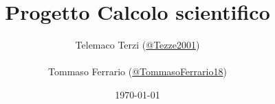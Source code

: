\documentclass[a4paper, oneside]{report}
\title{Progetto Calcolo scientifico}
\author{
    Telemaco Terzi (\href{https://github.com/Tezze2001}{@Tezze2001}) \\\\
    Tommaso Ferrario (\href{https://github.com/TommasoFerrario18}{@TommasoFerrario18})
    }
\date{\today}
\begin{document}
\maketitle
\newtheorem{teorema}{Teorema}
\newtheorem{dimostrazione}{Dimostrazione}
\newtheorem{definizione}{Definizione}
\newtheorem{esempio}{Esempio}

\tableofcontents



\end{document}
